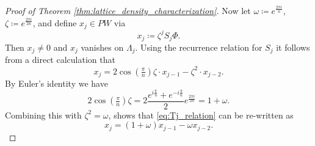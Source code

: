 \documentclass[10pt,a4paper]{amsart}
\begin{document}
\begin{proof}[Proof of Theorem \ref{thm:lattice_density_characterization}]
Now let $\omega \coloneqq e^{\frac{2\pi i }{n}}$, $\zeta \coloneqq e^{\frac{2\pi i }{2n}}$, and define $x_j \in PW$ via
    $$
    x_j \coloneqq \zeta^j S_j \Phi.
    $$
    Then $x_j \neq 0$ and $x_j$ vanishes on $\Lambda_j$.
    Using the recurrence relation for $S_j$ it follows from a direct calculation that
    \begin{equation}\label{eq:Tj_relation}
        x_j = 2 \cos(\tfrac{\pi}{n}) \zeta \cdot  x_{j-1} - \zeta^2 \cdot  x_{j-2}.
    \end{equation}
    By Euler's identity we have
    $$
    2 \cos(\tfrac{\pi}{n}) \zeta = 2 \frac{e^{i\frac{\pi}{n}} + e^{-i\frac{\pi}{n}}}{2} e^{\frac{2\pi i }{2n}} = 1+\omega.
    $$
    Combining this with $\zeta^2 = \omega$, shows that \eqref{eq:Tj_relation} can be re-written as
    $$
    x_j = (1+\omega) x_{j-1} - \omega x_{j-2}.
    $$
\end{proof}
\end{document}

